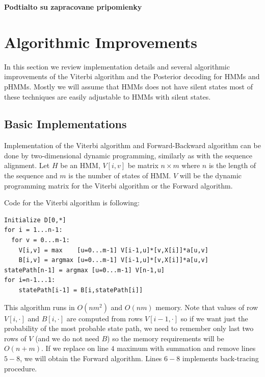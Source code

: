 


\bigskip
{\large\bf Podtialto su zapracovane pripomienky}
\bigskip


\section{Algorithmic Improvements}
\label{SECTION:ALGORITHMICIMPROVEMENTS}

In this section we review implementation details and several algorithmic
improvements of the Viterbi algorithm and the Posterior decoding for HMMs and
pHMMs. Mostly we will assume that HMMs does not have silent states most of these
techniques are easily adjustable to HMMs with silent states. 

\subsection{Basic Implementations}

Implementation of the Viterbi algorithm and Forward-Backward algorithm can be
done by two-dimensional dynamic programming, similarly as with the sequence
alignment. Let $H$ be an HMM, $V[i,v]$ be matrix $n\times m$ where $n$ is the
length of the sequence and $m$ is the number of states of HMM. $V$ will be the
dynamic programming matrix for the Viterbi algorithm or the Forward algorithm.

Code for the Viterbi algorithm is following:
\begin{lstlisting}
Initialize D[0,*]
for i = 1...n-1:
  for v = 0...m-1:
    V[i,v] = max    [u=0...m-1] V[i-1,u]*[v,X[i]]*a[u,v]
    B[i,v] = argmax [u=0...m-1] V[i-1,u]*[v,X[i]]*a[u,v]
statePath[n-1] = argmax [u=0...m-1] V[n-1,u]
for i=n-1...1:
    statePath[i-1] = B[i,statePath[i]]
\end{lstlisting}

This algorithm runs in $O(nm^2)$ and $O(nm)$ memory. Note that values of row
$V[i,\cdot]$ and $B[i,\cdot]$ are computed from rows $V[i-1,\cdot]$ so if we
want just the probability of the most probable state path, we need to remember
only last two rows of $V$ (and we do not need $B$) so the memory requirements
will be $O(n+m)$. If we replace on line $4$ maximum with summation and remove
lines $5-8$, we will
obtain the Forward algorithm. Lines $6-8$ implements back-tracing procedure.

